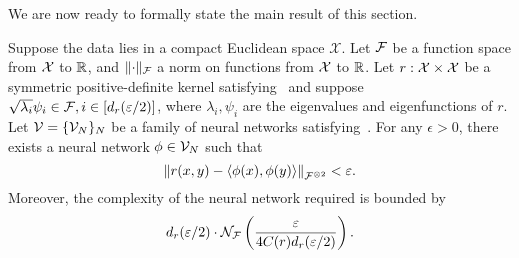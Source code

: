 We are now ready to formally state the main result of this section.

\begin{theorem}\label{theorem:symmetric_inner_prod_rels_func_class}
	Suppose the data lies in a compact Euclidean space $\mathcal{X}$. Let ${\mathcal{F}}$ be a function space from ${\mathcal{X}}$ to $\mathbb{R}$, and $\lVert\cdot\rVert_{\mathcal{F}}$ a norm on functions from  ${\mathcal{X}}$ to $\mathbb{R}$.
	Let $r: {\mathcal{X}} \times {\mathcal{X}}$ be a symmetric positive-definite kernel satisfying~ and suppose $\sqrt{\lambda_i} \psi_i \in {\mathcal{F}}, i \in [d_r(\varepsilon / 2)]$, where $\lambda_i, \psi_i$ are the eigenvalues and eigenfunctions of $r$.
	Let ${\mathcal{V}} = \{{\mathcal{V}}_N\}_N$ be a family of neural networks satisfying~.
	For any $\epsilon > 0$, there exists a neural network $\phi \in {\mathcal{V}}_N$ such that 
	\[\left\lVert r(x,y) - \left \langle \phi(x), \phi(y) \right\rangle\right\rVert_{{\mathcal{F}}^{\otimes 2}} < \varepsilon.\]
	Moreover, the complexity of the neural network required is bounded by
	\[d_r(\varepsilon/2) \cdot {\mathcal{N}}_{\mathcal{F}}\left(\frac{\varepsilon}{4 C(r) d_r(\varepsilon/2)}\right).\]
\end{theorem}

